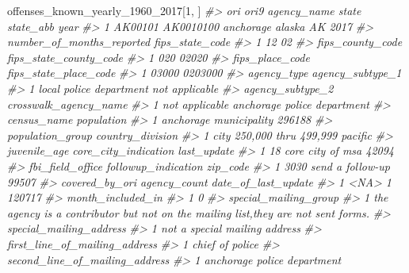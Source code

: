\documentclass[
]{krantz}
\makeatletter
\newenvironment{Shaded}{\begin{snugshade}}{\end{snugshade}}
\newcommand{\CommentTok}[1]{\textcolor[rgb]{0.37,0.37,0.37}{\textit{#1}}}
\newcommand{\DecValTok}[1]{\textcolor[rgb]{0.06,0.06,0.06}{#1}}
\newcommand{\NormalTok}[1]{#1}
\newenvironment{kframe}{%
\medskip{}
\setlength{\fboxsep}{.8em}
 \def\at@end@of@kframe{}%
 \ifinner\ifhmode%
  \def\at@end@of@kframe{\end{minipage}}%
  \begin{minipage}{\columnwidth}%
 \fi\fi%
 \def\FrameCommand##1{\hskip\@totalleftmargin \hskip-\fboxsep
 \colorbox{shadecolor}{##1}\hskip-\fboxsep
     \hskip-\linewidth \hskip-\@totalleftmargin \hskip\columnwidth}%
 \MakeFramed {\advance\hsize-\width
   \@totalleftmargin\z@ \linewidth\hsize
   \@setminipage}}%
 {\par\unskip\endMakeFramed%
 \at@end@of@kframe}
\renewenvironment{Shaded}{\begin{kframe}}{\end{kframe}}
\makeatother
\begin{document}
\begin{Shaded}
\begin{Highlighting}[]
\NormalTok{offenses\_known\_yearly\_1960\_2017[}\DecValTok{1}\NormalTok{, ]}
\CommentTok{\#\textgreater{}       ori      ori9 agency\_name  state state\_abb year}
\CommentTok{\#\textgreater{} 1 AK00101 AK0010100   anchorage alaska        AK 2017}
\CommentTok{\#\textgreater{}   number\_of\_months\_reported fips\_state\_code}
\CommentTok{\#\textgreater{} 1                        12              02}
\CommentTok{\#\textgreater{}   fips\_county\_code fips\_state\_county\_code}
\CommentTok{\#\textgreater{} 1              020                  02020}
\CommentTok{\#\textgreater{}   fips\_place\_code fips\_state\_place\_code}
\CommentTok{\#\textgreater{} 1           03000               0203000}
\CommentTok{\#\textgreater{}               agency\_type agency\_subtype\_1}
\CommentTok{\#\textgreater{} 1 local police department   not applicable}
\CommentTok{\#\textgreater{}   agency\_subtype\_2       crosswalk\_agency\_name}
\CommentTok{\#\textgreater{} 1   not applicable anchorage police department}
\CommentTok{\#\textgreater{}              census\_name population}
\CommentTok{\#\textgreater{} 1 anchorage municipality     296188}
\CommentTok{\#\textgreater{}            population\_group country\_division}
\CommentTok{\#\textgreater{} 1 city 250,000 thru 499,999          pacific}
\CommentTok{\#\textgreater{}   juvenile\_age core\_city\_indication last\_update}
\CommentTok{\#\textgreater{} 1           18     core city of msa       42094}
\CommentTok{\#\textgreater{}   fbi\_field\_office followup\_indication zip\_code}
\CommentTok{\#\textgreater{} 1             3030    send a follow{-}up    99507}
\CommentTok{\#\textgreater{}   covered\_by\_ori agency\_count date\_of\_last\_update}
\CommentTok{\#\textgreater{} 1           \textless{}NA\textgreater{}            1              120717}
\CommentTok{\#\textgreater{}   month\_included\_in}
\CommentTok{\#\textgreater{} 1                 0}
\CommentTok{\#\textgreater{}                                                              special\_mailing\_group}
\CommentTok{\#\textgreater{} 1 the agency is a contributor but not on the mailing list,they are not sent forms.}
\CommentTok{\#\textgreater{}         special\_mailing\_address}
\CommentTok{\#\textgreater{} 1 not a special mailing address}
\CommentTok{\#\textgreater{}   first\_line\_of\_mailing\_address}
\CommentTok{\#\textgreater{} 1               chief of police}
\CommentTok{\#\textgreater{}   second\_line\_of\_mailing\_address}
\CommentTok{\#\textgreater{} 1    anchorage police department}

\end{Highlighting}
\end{Shaded}
\end{document}
